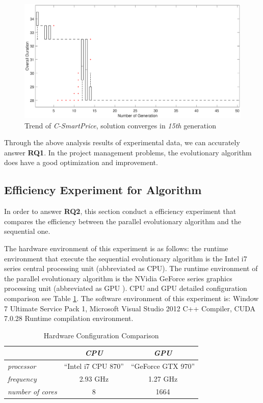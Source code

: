 \begin{figure}[!htb]
  \centering
  \includegraphics[width=\textwidth]{figures/fig_pa3.eps}
  \caption{Trend of \emph{C-SmartPrice}, solution converges in \emph{15th} generation}
  \label{fig:pa3}
\end{figure}

Through the above analysis results of experimental data, we can accurately
answer \textbf{RQ1}. In the project management problems, the evolutionary
algorithm does have a good optimization and improvement.


\subsection{Efficiency Experiment for Algorithm}
%
In order to answer \textbf{RQ2}, this section conduct a efficiency experiment
that compares the efficiency between the parallel evolutionary algorithm and the
sequential one.

The hardware environment of this experiment is as follows: the
runtime environment that execute the sequential evolutionary algorithm is the
Intel i7 series central processing unit (abbreviated as CPU). The runtime
environment of the parallel evolutionary algorithm is the NVidia GeForce series
graphics processing unit (abbreviated as GPU ). CPU and GPU detailed
configuration comparison see Table \ref{tab:cpugpu}. The software environment of
this experiment is: Window 7 Ultimate Service Pack 1, Microsoft Visual Studio
2012 C++ Compiler, CUDA 7.0.28 Runtime compilation environment.

\begin{table}
  \centering
  \caption{Hardware Configuration Comparison}
  \label{tab:cpugpu}
  \begin{tabular}{lcc}
    \hline
        & \emph{ CPU } & \emph{ GPU } \\
    \hline
    \emph{ processor } & ``Intel i7 CPU 870'' & ``GeForce GTX 970'' \\
    \emph{ frequency } & 2.93 GHz & 1.27 GHz \\
    \emph{ number of cores } & 8 & 1664 \\
    \hline
  \end{tabular}
\end{table}

